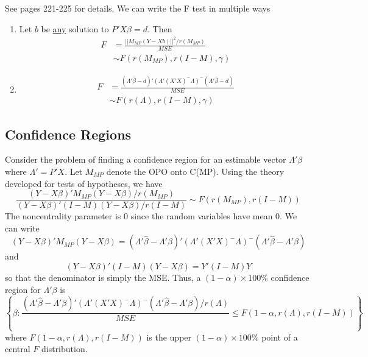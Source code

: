 \documentclass[12pt]{article}
\newcommand{\bhat}{\hat{\beta}}
\numberwithin{equation}{section}
\begin{document}
See pages 221-225 for details. We can write the F test in multiple ways
%
\begin{enumerate}
  \item Let $b$ be \underline{any} solution to $P'X\beta = d$. Then
  \begin{align*}
    F &= \frac{||M_{MP}(Y - Xb)||^2 / r(M_{MP})}{MSE} \\
      & \sim F(r(M_{MP}), r(I - M), \gamma)
  \end{align*}
  \item
  \begin{align*}
    F &= \frac{(\Lambda'\bhat - d)'(\Lambda'(X'X)^{-}\Lambda)^{-} (\Lambda'\bhat - d)}{MSE} \\
    & \sim F(r(\Lambda), r(I - M), \gamma)
  \end{align*}
\end{enumerate}

\subsection{Confidence Regions}
Consider the problem of finding a confidence region for an estimable vector $\Lambda' \beta$ where $\Lambda' = P'X$. Let $M_{MP}$ denote the OPO onto C(MP). Using the theory developed for tests of hypotheses, we have
\begin{equation*}
  \frac{(Y - X\beta)'M_{MP} (Y - X\beta) / r(M_{MP})}%
  {(Y - X\beta)'(I - M)(Y - X\beta) / r(I - M)} %
  \sim F(r(M_{MP}), r(I - M))
\end{equation*}
%
The noncentrality parameter is 0 since the random variables have mean 0. We can write
\begin{equation*}
  (Y - X\beta)'M_{MP}(Y - X\beta) = (\Lambda' \bhat - \Lambda' \beta)'(\Lambda' (X'X)^{-} \Lambda)^{-}(\Lambda'\bhat - \Lambda' \beta)
\end{equation*}
%
and
%
\begin{equation*}
  (Y - X\beta)'(I - M)(Y - X\beta) = Y'(I - M)Y
\end{equation*}
so that the denominator is simply the MSE. Thus, a $(1 - \alpha) \times 100\%$ confidence region for $\Lambda'\beta$ is
\begin{equation*}
  \left\{
  \beta: \frac{(\Lambda' \bhat - \Lambda' \beta)'(\Lambda' (X'X)^{-} \Lambda)^{-}(\Lambda'\bhat - \Lambda' \beta) / r(\Lambda)}%
  {MSE} \le F(1 - \alpha, r(\Lambda), r(I - M))
  \right\}
\end{equation*}
%
where $F(1 - \alpha, r(\Lambda), r(I - M))$ is the upper $(1 - \alpha) \times 100 \%$ point of a central $F$ distribution.
\end{document}
